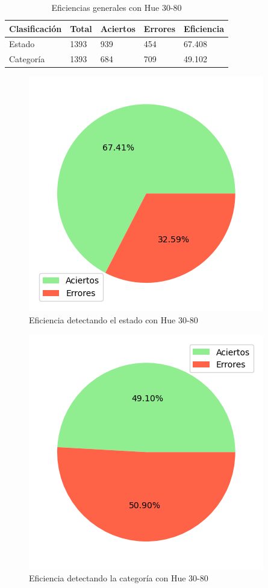 \begin{table}[H]
\centering
\begin{tabular}{|l|l|l|l|l|}
\hline 
\textbf{Clasificación} & \textbf{Total} & \textbf{Aciertos} & \textbf{Errores} & \textbf{Eficiencia} \\
\hline
Estado & 1393 & 939 & 454 & 67.408 \\
\hline 
Categoría & 1393 & 684 & 709 & 49.102 \\
\hline 
\end{tabular}
\caption{Eficiencias generales con Hue 30-80}
\label{table:efficiency_general_30_80}
\end{table}

\begin{figure}[H]
\centering
\includegraphics[scale=0.6]{images/result_global_state_30_80.png}
\caption{Eficiencia detectando el estado con Hue 30-80}
\label{img:efficiency_state_30_80}
\end{figure}

\captionsetup[figure]{skip=-10pt}

\begin{figure}[H]
\centering
\includegraphics[scale=0.6]{images/result_global_class_30_80.png}
\caption{Eficiencia detectando la categoría con Hue 30-80}
\label{img:efficiency_category_30_80}
\end{figure}

